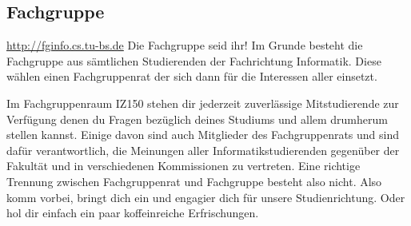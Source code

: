 \begin{multicols}{2}
\subsection{Fachgruppe}
	\label{fachgruppe}
	\url{http://fginfo.cs.tu-bs.de}
	Die Fachgruppe seid ihr! Im Grunde besteht die Fachgruppe aus sämtlichen Studierenden der Fachrichtung Informatik. Diese wählen einen Fachgruppenrat der sich dann für die Interessen aller einsetzt. 

	Im Fachgruppenraum IZ150 stehen dir jederzeit zuverlässige Mitstudierende zur Verfügung denen du Fragen bezüglich deines Studiums und allem drumherum stellen kannst. Einige davon sind auch Mitglieder des Fachgruppenrats und sind dafür verantwortlich, die Meinungen aller Informatikstudierenden gegenüber der Fakultät und in verschiedenen Kommissionen zu vertreten. Eine richtige Trennung zwischen Fachgruppenrat und Fachgruppe besteht also nicht. Also komm vorbei, bringt dich ein und engagier dich für unsere Studienrichtung. Oder hol dir einfach ein paar koffeinreiche Erfrischungen. 
\end{multicols}